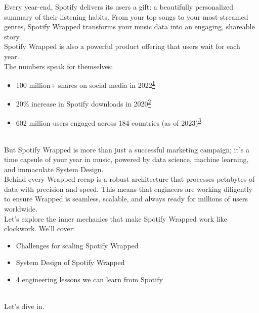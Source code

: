 

Every year-end, Spotify delivers its users a gift: a beautifully personalized summary of their listening habits. From your top songs to your most-streamed genres, Spotify Wrapped transforms your music data into an engaging, shareable story.
\\
Spotify Wrapped is also a powerful product offering that users wait for each year.~
\\
The numbers speak for themselves:

\begin{itemize}
\item
\protect{}\label{c62yztrYtRJjb4gn02RE6}
100 million+ shares on social media in 2022\href{https://hightouch.com/blog/how-spotify-wrapped-works}{\textsuperscript{\ul{1}}}
\item
\protect{}\label{bM_fFxfdPtAkfAsSDS2AH}
20\% increase in Spotify downloads in 2020\href{https://www.moengage.com/blog/spotify-wrapped-2020-app-downloads-engagement/}{\textsuperscript{\ul{2}}}
\item
\protect{}\label{NuC5gfpV9BMusgcPX7LpB}
602 million users engaged across 184 countries (as of 2023)\href{https://investors.spotify.com/financials/default.aspx\#quarterly-results}{\textsuperscript{\ul{3}}}
\end{itemize}
\\
But Spotify Wrapped is more than just a successful marketing campaign; it's a time capsule of your year in music, powered by data science, machine learning, and immaculate System Design.
\\
Behind every Wrapped recap is a robust architecture that processes petabytes of data with precision and speed. This means that engineers are working diligently to ensure Wrapped is seamless, scalable, and always ready for millions of users worldwide.~
\\
Let's explore the inner mechanics that make Spotify Wrapped work like clockwork. We'll cover:

\begin{itemize}
\item
\protect{}\label{8EkbFA6VhOY1dHmwsaUYl}
Challenges for scaling Spotify Wrapped
\item
\protect{}\label{4lMnAMTt7BX5jmyhVr8QP}
System Design of Spotify Wrapped
\item
\protect{}\label{XlM1zg0rBg3WsWOlOV4bq}
4 engineering lessons we can learn from Spotify
\end{itemize}
\\
Let's dive in.

